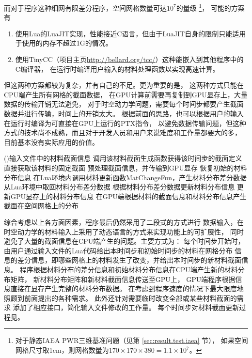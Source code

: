 而对于\ProgramName 程序这种细网有限差分程序，空间网格数量可达$10^7$的量级
\footnote{对于静态IAEA PWR三维基准问题（见第 \ref{sec:result.test.iaea} 节），
如果空间网格尺寸取1cm，则网格数量为$170\times170\times380=1.1\times10^7$。}，
可能的方案有
\begin{enumerate}
\item
使用Lua的LuaJIT实现，性能接近C语言，但由于LuaJIT自身的限制只能适用于使用的内存不超过1G的情况。

\item
使用TinyCC（项目主页\url{http://bellard.org/tcc/}）这种能嵌入到其他程序中的C编译器，
在运行时编译用户输入的材料处理函数以实现高速计算。
\end{enumerate}
但这两种方案都较为复杂，并有自己的不足。更为重要的是，
这两种方式只能在CPU端产生所有网格的截面数据，
在GPU计算前需要再复制到GPU显存上，大量数据的传输开销无法避免，
对于时空动力学问题，需要每个时间步都要产生截面数据并进行传输，时间上的开销太大。
根据前面的思路，也可以根据用户的输入在运行时编译为可直接在GPU上运行的PTX指令，
以避免数据传输问题，但这种方式的技术尚不成熟，而且对于开发人员和用户来说难度和工作量都要大的多，
目前基本没有实际应用的价值。

\begin{algorithm}
\ForEach(){输入文件中的材料截面信息}
{
  {
  调用该材料截面生成函数获得该时间步的截面定义\;
  }
  \Else
  {
  直接获取该材料的固定截面\;
}
}
预处理截面信息，并传输到GPU显存\;
{
  {
    恢复初始的材料分布信息\;
  }
  在Lua环境内调用材料更新函数MatChangeFun，产生材料分布差分数据\;
  从Lua环境中取回材料分布差分数据\;
  根据材料分布差分数据更新材料分布信息\;
  更新GPU显存上的材料分布信息\;
}
在GPU端根据材料的截面信息和材料分布信息产生截面在空间网格上的分布\;
\caption{\label{alg:program.material.update}每个时间步\ProgramName 对材料截面更新过程}
\end{algorithm}

综合考虑以上各方面因素，\ProgramName 程序最后仍然采用了二段式的方式进行
数据输入，在时空动力学的材料输入上采用了动态语言的方式来实现功能上的可扩展性，
同时避免了大量的截面信息在CPU端产生的问题。主要方式为：
每个时间步开始时，由用户通过输入文件的Lua代码给出本时间步和初始时间步的材料在网格分布
信息的差分信息，即哪些网格上的材料发生了改变，并给出本时间步的新材料截面信息。
程序根据材料分布的差分信息和初始材料分布信息在CPU端产生新的材料分布矩阵，
新材料分布矩阵和新材料截面信息传送至GPU上，
GPU端程序根据信息直接在显存产生完整的材料分布数据。
在考虑到程序速度的情况下最大限度地照顾到前面提出的各种需求。
此外\ProgramName 还针对需要临时改变全部或某些材料截面的需求
添加了相应接口，简化输入文件修改的工作量。
每个时间步\ProgramName 对材料截面更新过程见。

